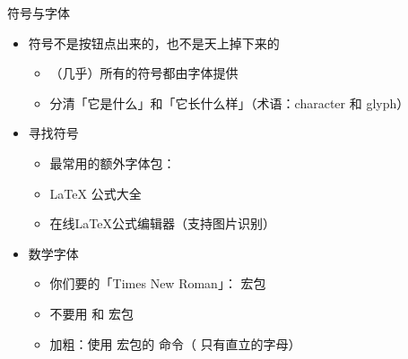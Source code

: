 \begin{frame}[fragile]{符号与字体}
  \begin{itemize}
    \item 符号不是按钮点出来的，也不是天上掉下来的 \pause
    \begin{itemize}
      \item （几乎）所有的符号都由字体提供 \pause
      \item 分清「它是什么」和「它长什么样」（术语：character 和 glyph）
    \end{itemize} \pause
    \item 寻找符号
    \begin{itemize}
      \item 最常用的额外字体包：
      \item \LaTeX{} 公式大全 
      \item 在线\LaTeX{}公式编辑器（支持图片识别） 
    \end{itemize} \pause
    \item 数学字体
    \begin{itemize}
      \item 你们要的「Times New Roman」： 宏包
      \item \alert{不要用  和  宏包}
      \item 加粗：使用  宏包的 \texttt{\bm} 命令（\texttt{\mathbf} 只有直立的字母）
    \end{itemize} 
  \end{itemize}
\end{frame}

